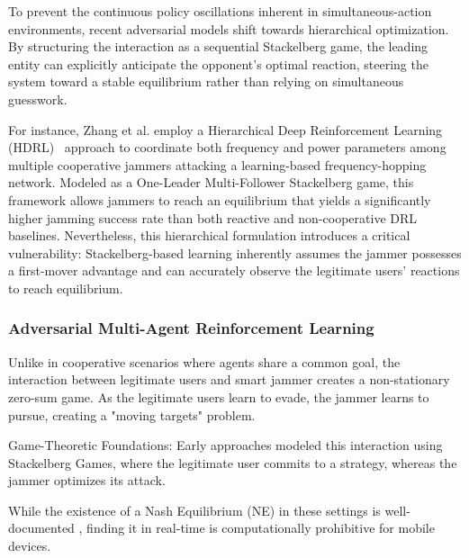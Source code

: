 \documentclass[journal]{IEEEtran}
\newcommand{\adm}[1]{{\color{orange}{[#1]}}}
\begin{document}
To prevent the continuous policy oscillations inherent in simultaneous-action environments, recent adversarial models shift towards hierarchical optimization. 
By structuring the interaction as a sequential Stackelberg game, the leading entity can explicitly anticipate the opponent's optimal reaction, steering the system toward a stable equilibrium rather than relying on simultaneous guesswork.

For instance, Zhang et al. employ a Hierarchical Deep Reinforcement Learning (HDRL)~\cite{article} approach to coordinate both frequency and power parameters among multiple cooperative jammers attacking a learning-based frequency-hopping network.
Modeled as a One-Leader Multi-Follower Stackelberg game, this framework allows jammers 
to reach an equilibrium that yields a significantly higher jamming success rate than both reactive and non-cooperative DRL baselines.
Nevertheless, this hierarchical formulation introduces a critical vulnerability: Stackelberg-based learning inherently assumes the jammer possesses a first-mover advantage and can accurately observe the legitimate users' reactions to reach equilibrium.

\subsubsection{Adversarial Multi-Agent Reinforcement Learning}
Unlike in cooperative scenarios where agents share a common goal, the interaction between legitimate users and smart jammer creates a non-stationary zero-sum game. 
As the legitimate users learn to evade, the jammer learns to pursue, creating a "moving targets" problem.

Game-Theoretic Foundations:
Early approaches modeled this interaction using Stackelberg Games, where the legitimate user commits to a strategy, whereas the jammer optimizes its attack. 

While the existence of a Nash Equilibrium (NE) in these settings is well-documented \cite{xu2020convert}
, finding it in real-time is computationally prohibitive for mobile devices. 
\end{document}
